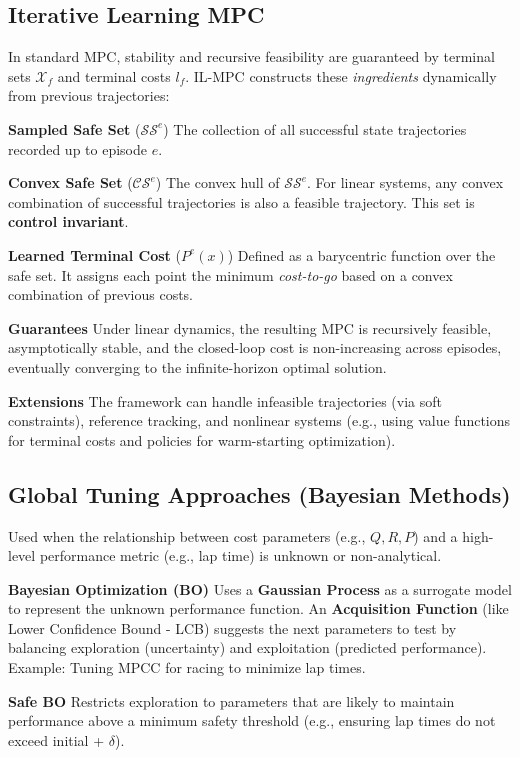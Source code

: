 
\subsection{Iterative Learning MPC}

In standard MPC, stability and recursive feasibility are guaranteed
by terminal sets $\mathcal{X}_f$ and terminal costs $l_f$.
IL-MPC constructs these \textit{ingredients} dynamically
from previous trajectories:

\textbf{Sampled Safe Set} ($\mathcal{SS}^e$)
The collection of all successful
state trajectories recorded up to episode $e$.

\textbf{Convex Safe Set} ($\mathcal{CS}^e$)
The convex hull of $\mathcal{SS}^e$.
For linear systems,
any convex combination of successful trajectories
is also a feasible trajectory.
This set is \textbf{control invariant}.

\textbf{Learned Terminal Cost} ($P^e(x)$)
Defined as a barycentric function over the safe set.
It assigns each point the minimum \textit{cost-to-go}
based on a convex combination of previous costs.

\textbf{Guarantees}
Under linear dynamics, the resulting MPC is recursively feasible,
asymptotically stable, and the closed-loop cost
is non-increasing across episodes, eventually converging to the
infinite-horizon optimal solution.

\textbf{Extensions}
The framework can handle infeasible trajectories (via soft constraints),
reference tracking, and nonlinear systems (e.g., using value functions
for terminal costs and policies for warm-starting optimization).

\subsection{Global Tuning Approaches (Bayesian Methods)}

Used when the relationship between cost parameters (e.g., $Q, R, P$)
and a high-level performance metric (e.g., lap time) is unknown or
non-analytical.

\textbf{Bayesian Optimization (BO)}
Uses a \textbf{Gaussian Process} as a surrogate model
to represent the unknown performance function.
An \textbf{Acquisition Function} (like Lower Confidence Bound - LCB)
suggests the next parameters to test by balancing
exploration (uncertainty) and exploitation (predicted performance).
Example: Tuning MPCC for racing to minimize lap times.

\textbf{Safe BO}
Restricts exploration to parameters that are likely
to maintain performance above a minimum safety threshold
(e.g., ensuring lap times do not exceed initial + $\delta$).


